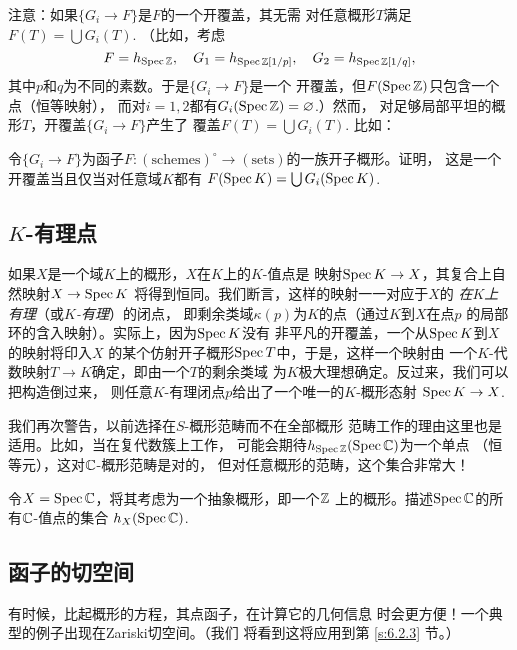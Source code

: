 注意：如果$\{G_i\to F\}$是$F$的一个开覆盖，其无需
对任意概形$T$满足$F(T)=\bigcup G_i(T)$. （比如，考虑
\[
	F=h_{\operatorname{Spec} \mathbb{Z}},\quad G_1=h_{\operatorname{Spec} \mathbb{Z}[1/p]},
	\quad G_2=h_{\operatorname{Spec} \mathbb{Z}[1/q]},
\]
其中$p$和$q$为不同的素数。于是$\{G_i\to F\}$是一个
开覆盖，但$F(\operatorname{Spec} \mathbb{Z})$只包含一个点（恒等映射），
而对$i=1,2$都有$G_i(\operatorname{Spec} \mathbb{Z})=\varnothing$.）然而，
对足够局部平坦的概形$T$，开覆盖$\{G_i\to F\}$产生了
覆盖$F(T)=\bigcup G_i(T)$. 比如：


\begin{exe} \label{exe:6.11}
	令$\{G_i\to F\}$为函子$F:(\text{schemes})^\circ
	\to (\text{sets})$的一族开子概形。证明，
	这是一个开覆盖当且仅当对任意域$K$都有
	$F(\operatorname{Spec} K)=\bigcup G_i(\operatorname{Spec} K)$.
\end{exe}

\subsection{\texorpdfstring{$K$}{K}-有理点}
\label{s:6.1.2}

如果$X$是一个域$K$上的概形，$X$在$K$上的$K$-值点是
映射$\operatorname{Spec} K\to X$，其复合上自然映射$X\to \operatorname{Spec} K$
将得到恒同。我们断言，这样的映射一一对应于$X$的
\textit{在$K$上有理}（或\textit{$K$-有理}）的闭点，
即剩余类域$\kappa(p)$为$K$的点（通过$K$到$X$在点$p$
的局部环的含入映射）。实际上，因为$\operatorname{Spec} K$没有
非平凡的开覆盖，一个从$\operatorname{Spec} K$到$X$的映射将印入$X$
的某个仿射开子概形$\operatorname{Spec} T$中，于是，这样一个映射由
一个$K$-代数映射$T\to K$确定，即由一个$T$的剩余类域
为$K$极大理想确定。反过来，我们可以把构造倒过来，
则任意$K$-有理闭点$p$给出了一个唯一的$K$-概形态射
$\operatorname{Spec} K\to X$.

我们再次警告，以前选择在$S$-概形范畴而不在全部概形
范畴工作的理由这里也是适用。比如，当在复代数簇上工作，
可能会期待$h_{\operatorname{Spec} \mathbb{Z}}(\operatorname{Spec} \mathbb{C})$为一个单点
（恒等元），这对$\mathbb{C}$-概形范畴是对的，
但对任意概形的范畴，这个集合非常大！

\begin{exe}\label{exe:6.12}
令$X=\operatorname{Spec} \mathbb{C}$，将其考虑为一个抽象概形，即一个$\mathbb{Z}$
上的概形。描述$\operatorname{Spec} \mathbb{C}$的所有$\mathbb{C}$-值点的集合
$h_X(\operatorname{Spec} \mathbb{C})$.
\end{exe}

\subsection{函子的切空间} \label{s:6.1.3}

有时候，比起概形的方程，其点函子，在计算它的几何信息
时会更方便！一个典型的例子出现在Zariski切空间。（我们
将看到这将应用到第 \ref{s:6.2.3} 节。）

